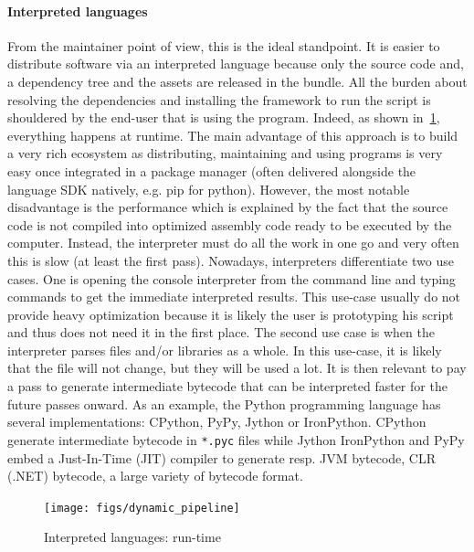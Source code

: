 \paragraph{Interpreted languages} From the maintainer point of view, this is the ideal standpoint. It is easier to
distribute software via an interpreted language because only the source code and, a dependency tree and the assets are
released in the bundle. All the burden about resolving the dependencies and installing the framework to run the script
is shouldered by the end-user that is using the program. Indeed, as shown in~\cref{fig:static.dynamic.dynamic.pipeline},
everything happens at runtime. The main advantage of this approach is to build a very rich ecosystem as distributing,
maintaining and using programs is very easy once integrated in a package manager (often delivered alongside the language
SDK natively, e.g. pip for python). However, the most notable disadvantage is the performance which is explained by the
fact that the source code is not compiled into optimized assembly code ready to be executed by the computer. Instead,
the interpreter must do all the work in one go and very often this is slow (at least the first pass). Nowadays,
interpreters differentiate two use cases. One is opening the console interpreter from the command line and typing
commands to get the immediate interpreted results. This use-case usually do not provide heavy optimization because it is
likely the user is prototyping his script and thus does not need it in the first place. The second use case is when the
interpreter parses files and/or libraries as a whole. In this use-case, it is likely that the file will not change, but
they will be used a lot. It is then relevant to pay a pass to generate intermediate bytecode that can be interpreted
faster for the future passes onward. As an example, the Python programming language has several implementations:
CPython, PyPy, Jython or IronPython. CPython generate intermediate bytecode in \texttt{*.pyc} files while Jython
IronPython and PyPy embed a Just-In-Time (JIT) compiler to generate resp. JVM bytecode, CLR (.NET) bytecode, a large
variety of bytecode format.

\begin{figure}[htbp]
  \centering
  \texttt{[image: figs/dynamic\_pipeline]}
  \caption{Interpreted languages: run-time}
  \label{fig:static.dynamic.dynamic.pipeline}
\end{figure}

